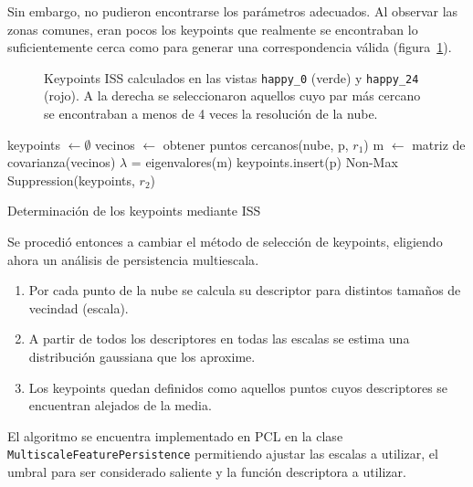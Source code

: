 			Sin embargo, no pudieron encontrarse los parámetros adecuados.
			Al observar las zonas comunes, eran pocos los keypoints que
			realmente se encontraban lo suficientemente cerca como para generar
			una correspondencia válida (figura~\ref{fig:iss_key}).


			\begin{figure}
				\caption{\label{fig:iss_key}Keypoints ISS calculados en las vistas \texttt{happy\_0} (verde) y \texttt{happy\_24} (rojo).
				A la derecha se seleccionaron aquellos cuyo par más cercano se encontraban a menos de 4 veces la resolución de la nube.
				}
			\end{figure}

			\begin{algorithm}
				\begin{algorithmic}[1]
						\State keypoints $\gets\emptyset$
							\State vecinos $\gets$ obtener puntos cercanos(nube, p, $r_1$)
							\State m $\gets$ matriz de covarianza(vecinos)
							\State $\lambda$ = eigenvalores(m)
								\State keypoints.insert(p)
							\EndIf
						\EndFor
						\State\Return Non-Max Suppression(keypoints, $r_2$)
					\EndFunction
				\end{algorithmic}
				\caption{\label{alg:iss}Determinación de los keypoints mediante ISS}
			\end{algorithm}


			Se procedió entonces a cambiar el método de selección de keypoints, eligiendo ahora un análisis de persistencia multiescala\cite{Rusu:2009:FPF:1703435.1703733}.
			\begin{enumerate}
				\item Por cada punto de la nube se calcula su descriptor para distintos tamaños de vecindad (escala).
				\item A partir de todos los descriptores en todas las escalas se estima una distribución gaussiana que los aproxime.
				\item Los keypoints quedan definidos como aquellos puntos cuyos descriptores se encuentran alejados de la media.
			\end{enumerate}
			El algoritmo se encuentra implementado en PCL en la clase
			\texttt{Multiscale\-Feature\-Persistence} permitiendo ajustar las
			escalas a utilizar, el umbral para ser considerado saliente y la
			función descriptora a utilizar.

